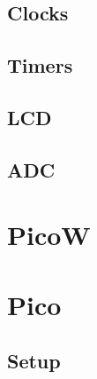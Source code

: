 \documentclass[journal]{IEEEtran}
\begin{document}
\subsection{Clocks}

\subsection{Timers}

\subsection{LCD}

\subsection{ADC}

\newpage
\appendices
\newpage
\section{PicoW}

\section{Pico}
\subsection{Setup}

%
%
\end{document}
